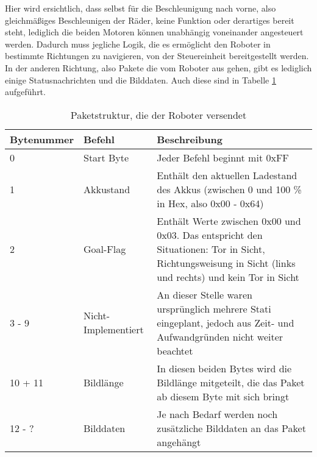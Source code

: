 Hier wird ersichtlich, dass selbst für die Beschleunigung nach vorne, also gleichmäßiges Beschleunigen der Räder, keine Funktion oder derartiges bereit steht, lediglich die beiden Motoren können unabhängig voneinander angesteuert werden. Dadurch muss jegliche Logik, die es ermöglicht den Roboter in bestimmte Richtungen zu navigieren, von der Steuereinheit bereitgestellt werden. \\

In der anderen Richtung, also Pakete die vom Roboter aus gehen, gibt es lediglich einige Statusnachrichten und die Bilddaten. Auch diese sind in Tabelle \ref{tab:robot_to_serv} aufgeführt.



\begin{table}
	\begin{tabular}{||p{}||p{}||p{}||}
		\hline Bytenummer & Befehl & Beschreibung \\ 
		\hline 0 & Start Byte &  Jeder Befehl beginnt mit 0xFF\\ 
		\hline 1 & Akkustand & Enthält den aktuellen Ladestand des Akkus (zwischen 0 und 100 \% in Hex, also 0x00 - 0x64) \\ 
		\hline 2 & Goal-Flag & Enthält Werte zwischen 0x00 und 0x03. Das entspricht den Situationen: Tor in Sicht, Richtungsweisung in Sicht (links und rechts) und kein Tor in Sicht \\ 
		\hline 3 - 9 & Nicht-Implementiert & An dieser Stelle waren ursprünglich mehrere Stati eingeplant, jedoch aus Zeit- und Aufwandgründen nicht weiter beachtet \\ 
		\hline 10 + 11 & Bildlänge & In diesen beiden Bytes wird die Bildlänge mitgeteilt, die das Paket ab diesem Byte mit sich bringt \\ 
		\hline 12 - ? & Bilddaten & Je nach Bedarf werden noch zusätzliche Bilddaten an das Paket angehängt \\
		\hline
	\end{tabular}  
	\caption{Paketstruktur, die der Roboter versendet}
	\label{tab:robot_to_serv}
\end{table}                         
